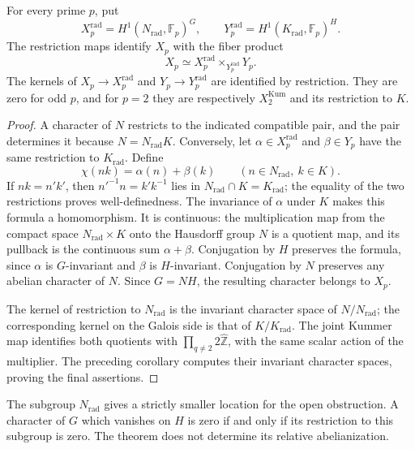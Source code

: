 \begin{proposition}\label{prop:radical-character-pullback}
For every prime $p$, put
\[
 X_p^{\mathrm{rad}}=H^1(N_{\mathrm{rad}},\mathbb F_p)^G,
 \qquad
 Y_p^{\mathrm{rad}}=H^1(K_{\mathrm{rad}},\mathbb F_p)^H.
\]
The restriction maps identify $X_p$ with the fiber product
\[
 X_p\simeq X_p^{\mathrm{rad}}
                  \mathop{\times}_{Y_p^{\mathrm{rad}}}Y_p.
\]
The kernels of $X_p\to X_p^{\mathrm{rad}}$ and
$Y_p\to Y_p^{\mathrm{rad}}$ are identified by restriction.
They are zero for odd $p$, and for $p=2$ they are respectively
$X_2^{\mathrm{Kum}}$ and its restriction to $K$.
\end{proposition}
\begin{proof}
A character of $N$ restricts to the indicated compatible pair,
and the pair determines it because $N=N_{\mathrm{rad}}K$.
Conversely, let $\alpha\in X_p^{\mathrm{rad}}$ and
$\beta\in Y_p$ have the same restriction to $K_{\mathrm{rad}}$.
Define
\[
 \chi(nk)=\alpha(n)+\beta(k)
       \qquad(n\in N_{\mathrm{rad}},\ k\in K).
\]
If $nk=n'k'$, then $n'^{-1}n=k'k^{-1}$ lies in
$N_{\mathrm{rad}}\cap K=K_{\mathrm{rad}}$; the equality of
the two restrictions proves well-definedness. The invariance of
$\alpha$ under $K$ makes this formula a homomorphism.
It is continuous: the multiplication map from the compact space
$N_{\mathrm{rad}}\times K$ onto the Hausdorff group $N$ is
a quotient map, and its pullback is the continuous sum
$\alpha+\beta$. Conjugation by $H$ preserves the formula,
since $\alpha$ is $G$-invariant and $\beta$ is $H$-invariant.
Conjugation by $N$ preserves any abelian character of $N$.
Since $G=NH$, the resulting character belongs to $X_p$.

The kernel of restriction to $N_{\mathrm{rad}}$ is the invariant
character space of $N/N_{\mathrm{rad}}$; the corresponding kernel
on the Galois side is that of $K/K_{\mathrm{rad}}$.
The joint Kummer map identifies both quotients with
$\prod_{q\ne2}2\widehat{\mathbb Z}$, with the same scalar action
of the multiplier. The preceding corollary computes their
invariant character spaces, proving the final assertions.
\end{proof}

The subgroup $N_{\mathrm{rad}}$ gives a strictly smaller location
for the open obstruction. A character of $G$ which vanishes on
$H$ is zero if and only if its restriction to this subgroup is zero.
The theorem does not determine its relative abelianization.
